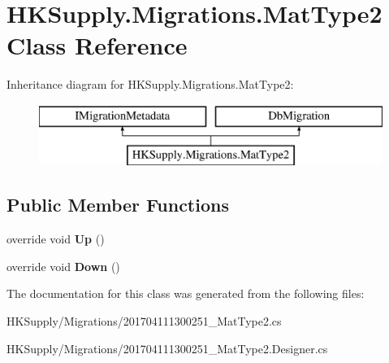 \hypertarget{class_h_k_supply_1_1_migrations_1_1_mat_type2}{}\section{H\+K\+Supply.\+Migrations.\+Mat\+Type2 Class Reference}
\label{class_h_k_supply_1_1_migrations_1_1_mat_type2}
Inheritance diagram for H\+K\+Supply.\+Migrations.\+Mat\+Type2\+:\begin{figure}[H]
\begin{center}
\leavevmode
\includegraphics[height=2.000000cm]{class_h_k_supply_1_1_migrations_1_1_mat_type2}
\end{center}
\end{figure}
\subsection*{Public Member Functions}
\begin{DoxyCompactItemize}
\item 
\mbox{\label{class_h_k_supply_1_1_migrations_1_1_mat_type2_ab9c8cfccbb02d5b8b74a7ca4df7dfb63}} 
override void {\bfseries Up} ()
\item 
\mbox{\label{class_h_k_supply_1_1_migrations_1_1_mat_type2_a7ea549e514900cd1c3d5624738a37e5e}} 
override void {\bfseries Down} ()
\end{DoxyCompactItemize}


The documentation for this class was generated from the following files\+:\begin{DoxyCompactItemize}
\item 
H\+K\+Supply/\+Migrations/201704111300251\+\_\+\+Mat\+Type2.\+cs\item 
H\+K\+Supply/\+Migrations/201704111300251\+\_\+\+Mat\+Type2.\+Designer.\+cs\end{DoxyCompactItemize}
